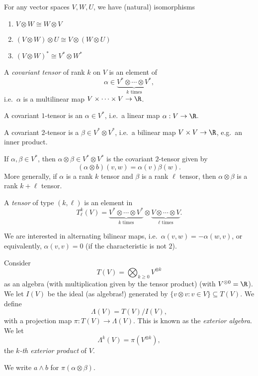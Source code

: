 \documentclass[a4paper]{article}
\begin{document}
\begin{prop}
  For any vector spaces $V, W, U$, we have (natural) isomorphisms
  \begin{enumerate}
    \item $V \otimes W \cong W \otimes V$
    \item $(V \otimes W) \otimes U \cong V \otimes (W \otimes U)$
    \item $(V \otimes W)^* \cong V^* \otimes W^*$
  \end{enumerate}
\end{prop}

\begin{defi}
  A \emph{covariant tensor} of rank $k$ on $V$ is an element of
  \[
    \alpha \in \underbrace{V^* \otimes \cdots \otimes V^*}_{k\text{ times}},
  \]
  i.e.\ $\alpha$ is a multilinear map $V \times \cdots \times V \to \R$.
\end{defi}

\begin{eg}
  A covariant $1$-tensor is an $\alpha \in V^*$, i.e.\ a linear map $\alpha: V \to \R$.

  A covariant $2$-tensor is a $\beta \in V^* \otimes V^*$, i.e.\ a bilinear map $V \times V \to \R$, e.g.\ an inner product.
\end{eg}

\begin{eg}
  If $\alpha, \beta \in V^*$, then $\alpha \otimes \beta \in V^* \otimes V^*$ is the covariant $2$-tensor given by
  \[
    (\alpha \otimes b)(v, w) = \alpha(v) \beta(w).
  \]
  More generally, if $\alpha$ is a rank $k$ tensor and $\beta$ is a rank $\ell$ tensor, then $\alpha \otimes \beta$ is a rank $k + \ell$ tensor.
\end{eg}

\begin{defi}[Tensor]
  A \emph{tensor} of type $(k, \ell)$ is an element in
  \[
    T^k_\ell(V) = \underbrace{V^* \otimes \cdots \otimes V^*}_{k\text{ times}} \otimes \underbrace{V \otimes \cdots \otimes V}_{\ell\text{ times}}.
  \]
\end{defi}
We are interested in alternating bilinear maps, i.e.\ $\alpha(v, w) = - \alpha(w, v)$, or equivalently, $\alpha(v, v) = 0$ (if the characteristic is not $2$).

\begin{defi}
  Consider
  \[
    T(V) = \bigotimes_{k \geq 0} V^{\otimes k}
  \]
  as an algebra (with multiplication given by the tensor product) (with $V^{\otimes 0} = \R$). We let $I(V)$ be the ideal (as algebras!) generated by $\{v \otimes v: v \in V\} \subseteq T(V)$. We define
  \[
    \Lambda (V) = T(V)/I(V),
  \]
  with a projection map $\pi: T(V) \to \Lambda(V)$. This is known as the \emph{exterior algebra}. We let
  \[
    \Lambda^k(V) = \pi(V^{\otimes k}),
  \]
  the \emph{$k$-th exterior product} of $V$.

  We write $a \wedge b$ for $\pi(\alpha \otimes \beta)$.
\end{defi}
\end{document}
